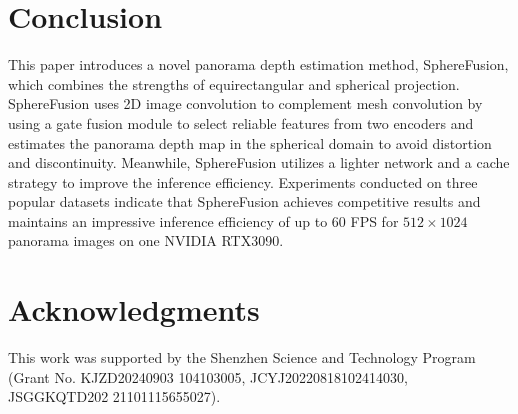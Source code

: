 \section{Conclusion}
\label{conclusion}

This paper introduces a novel panorama depth estimation method, SphereFusion, which combines the strengths of equirectangular and spherical projection. 
SphereFusion uses 2D image convolution to complement mesh convolution by using a gate fusion module to select reliable features from two encoders and estimates the panorama depth map in the spherical domain to avoid distortion and discontinuity. 
Meanwhile, SphereFusion utilizes a lighter network and a cache strategy to improve the inference efficiency. 
Experiments conducted on three popular datasets indicate that SphereFusion achieves competitive results and maintains an impressive inference efficiency of up to 60 FPS for $512 \times 1024$ panorama images on one NVIDIA RTX3090.

\section{Acknowledgments}
This work was supported by the Shenzhen Science and Technology Program (Grant No. KJZD20240903 104103005, JCYJ20220818102414030, JSGGKQTD202 21101115655027).